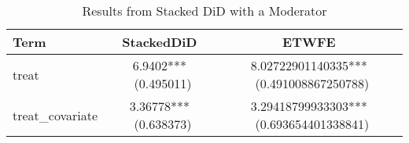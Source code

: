 \begin{table}[ht]
\centering
\caption{Results from Stacked DiD with a Moderator} 
\label{tab:stacked_cov}
\begin{tabular}{lcc}
  \toprule
Term & StackedDiD & ETWFE \\ 
  \midrule
treat & 6.9402*** \
(0.495011) & 8.02722901140335*** \
(0.491008867250788) \\ 
  treat_covariate & 3.36778*** \
(0.638373) & 3.29418799933303*** \
(0.693654401338841) \\ 
   \bottomrule
\end{tabular}
\end{table}
